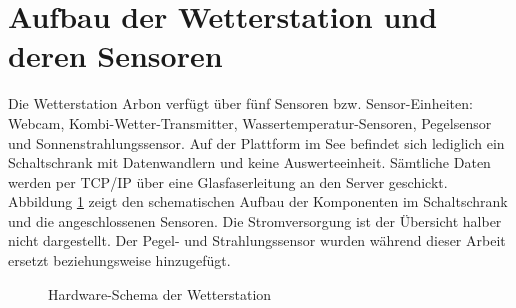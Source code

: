 \section{Aufbau der Wetterstation und deren Sensoren}


Die Wetterstation Arbon verfügt über fünf Sensoren bzw. Sensor-Einheiten: Webcam, Kombi-Wetter-Transmitter, Wassertemperatur-Sensoren, Pegelsensor und Sonnenstrahlungssensor. Auf der Plattform im See befindet sich lediglich ein Schaltschrank mit Datenwandlern und keine Auswerteeinheit. Sämtliche Daten werden per TCP/IP über eine Glasfaserleitung an den Server geschickt. Abbildung \ref{img:schaltschrank} zeigt den schematischen Aufbau der Komponenten im Schaltschrank und die angeschlossenen Sensoren. Die Stromversorgung ist der Übersicht halber nicht dargestellt. Der Pegel- und Strahlungssensor wurden während dieser Arbeit ersetzt beziehungsweise hinzugefügt.

\begin{figure}[htbp]
	\centering
	\caption{Hardware-Schema der Wetterstation}
	\label{img:schaltschrank}
\end{figure}


